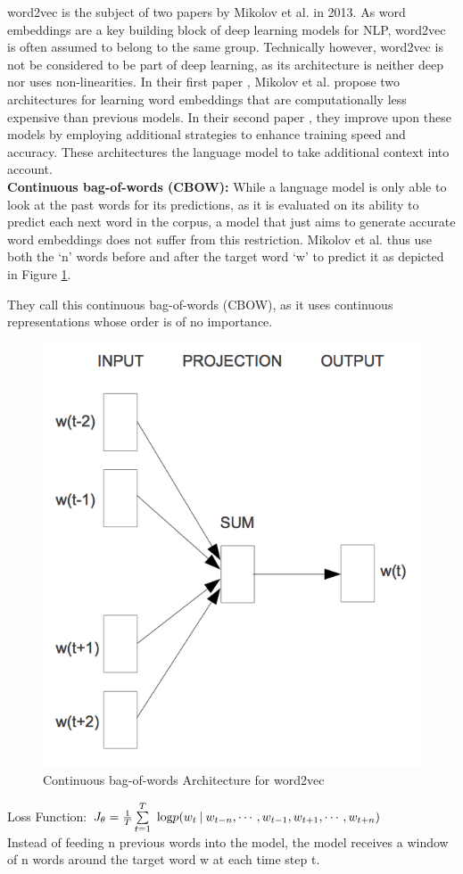 \documentclass[11pt, oneside]{article}   	%
\begin{document}
word2vec is the subject of two papers by Mikolov et al. in 2013. As word embeddings are a key building block of deep learning models for NLP, word2vec is often assumed to belong to the same group. Technically however, word2vec is not be considered to be part of deep learning, as its architecture is neither deep nor uses non-linearities.
In their first paper \cite{Mikolov1}, Mikolov et al. propose two architectures for learning word embeddings that are computationally less expensive than previous models. In their second paper \cite{Mikolov2}, they improve upon these models by employing additional strategies to enhance training speed and accuracy. These architectures the language model to take additional context into account.
\\
\textbf{Continuous bag-of-words (CBOW): }
While a language model is only able to look at the past words for its predictions, as it is evaluated on its ability to predict each next word in the corpus, a model that just aims to generate accurate word embeddings does not suffer from this restriction. Mikolov et al. thus use both the `n' words before and after the target word `w' to predict it as depicted in Figure \ref{fig:cbow}. 

They call this continuous bag-of-words (CBOW), as it uses continuous representations whose order is of no importance.

\begin{figure}[H]
\centering
\includegraphics[width=0.4\linewidth]{cbow}
\caption{Continuous bag-of-words Architecture for word2vec}
\label{fig:cbow}
\end{figure}

Loss Function:
\begin{math}
J_\theta = \frac{1}{T}\sum\limits_{t=1}^T\ \text{log} \space p(w_t \: | \: w_{t-n} , \cdots , w_{t-1}, w_{t+1}, \cdots , w_{t+n})
\end{math}
\\Instead of feeding n previous words into the model, the model receives a window of n words around the target word w at each time step t.
\end{document}
